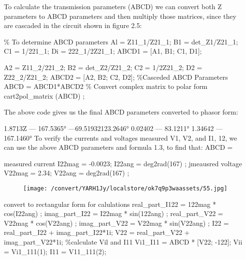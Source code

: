 \documentclass[12pt]{report}
\begin{document}
\vspace{10pt}

    To calculate the transmission parameters (ABCD) we can convert both Z  parameters to ABCD parameters and then multiply those matrices, since  they are cascaded in the circuit shown in figure 2.5: 

\vspace{10pt}

    \% To determine ABCD parameters  Al = Z11\_1/Z21\_1;   B1 = det\_Z1/Z21\_1;   C1 = 1/221\_1;   Di = 222\_1/2Z21\_1;   ABCD1 = [A1, B1; C1, D1]; 

\vspace{10pt}

    A2 = Z11\_2/221\_2;   B2 = det\_Z2/Z21\_2;   C2 = 1/2Z21\_2;   D2 = Z22\_2/Z21\_2;   ABCD2 = [A2, B2; C2, D2];   \%Casceded ABCD Parameters   ABCD = ABCD1*ABCD2   \% Convert complex matrix to polar form  cart2pol\_matrix (ABCD) ; 

\vspace{10pt}

    The above code gives us the final ABCD parameters converted to phasor  form: 

\vspace{10pt}

    1.8713Z — 167.5365° —69.51932123.2646°  0.02402 — 83.1211° 1.34642 — 167.1460°    To verify the currents and voltages measured V1, V2, and I1, 12, we can use  the above ABCD parameters and formula 1.3, to find that:    ABCD = 

\vspace{10pt}

    measured current  I22mag = -0.0023;  I22ang = deg2rad(167) ;  jmeausred voltage  V22mag = 2.34;   V22ang = deg2rad(167) ; 

\vspace{10pt}

\begin{figure}[h]

\texttt{[image: /convert/YARH1Jy/localstore/ok7q9p3waassets/55.jpg]}

\centering

\end{figure}

\par

\vspace{10pt}

    convert to rectangular form for calulations  real\_part\_I122 = 122mag * cos(I22ang) ;  imag\_part\_I22 = I22mag * sin(122ang) ;  real\_part\_V22 = V22mag * cos(V22ang) ;  imag\_part\_V22 = V22mag * sin(V22ang) ;  I22 = real\_part\_I22 + imag\_part\_I22*1i;  V22 = real\_part\_V22 + imag\_part\_V22*1i;  \%calculate Vil and I11   Vi1\_I11 = ABCD * [V22; -122];   Vii = Vi1\_111(1);   I11 = V11\_111(2); 
\end{document}
